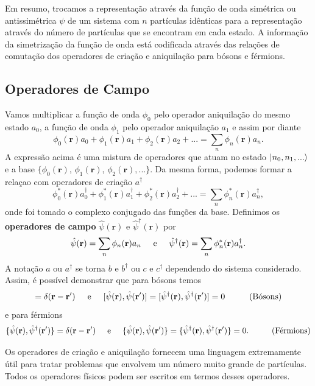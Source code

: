 \documentclass{article}
\begin{document}
Em resumo, trocamos a representação através da função de onda simétrica ou antissimétrica $\psi$ de um sistema com $n$ partículas idênticas para a representação através do número de partículas que se encontram em cada estado. A informação da simetrização da função de onda está codificada através das relações de comutação dos operadores de criação e aniquilação para bósons e férmions.


\subsection{Operadores de Campo}

Vamos multiplicar a função de onda $\phi_0$ pelo operador aniquilação do mesmo estado $a_0$, a função de onda $\phi_1$ pelo operador aniquilação $a_1$ e assim por diante
\begin{equation}
    \phi_0(\mathbf{r})a_0 + \phi_1(\mathbf{r})a_1 + \phi_2(\mathbf{r})a_2 + ... = \sum_n \phi_n(\mathbf{r})a_n.
\end{equation}
A expressão acima é uma mistura de operadores que atuam no estado $\ket{n_0,n_1,...}$ e a base $\{ \phi_0(\mathbf{r})$, $\phi_1(\mathbf{r})$, $\phi_2(\mathbf{r}),...\}$. Da mesma forma, podemos formar a relaçao com operadores de criação $a^\dagger$
\begin{equation}
    \phi_0^* (\mathbf{r})a_0^\dagger + \phi_1^* (\mathbf{r})a_1^\dagger + \phi_2^* (\mathbf{r})a_2^\dagger + ... = \sum_n \phi_n^* (\mathbf{r})a_n^\dagger,
\end{equation}
onde foi tomado o complexo conjugado das funções da base. Definimos os \textbf{operadores de campo} $\hat{\psi}(\mathbf{r})$ e $\hat{\psi}^\dagger (\mathbf{r})$ por
\begin{equation}
    \hat{\psi}(\mathbf{r}) = \sum_n \phi_n(\mathbf{r})a_n \hspace{0.5cm} \text{e} \hspace{0.5cm} \hat{\psi}^\dagger (\mathbf{r}) = \sum_n \phi_n^* (\mathbf{r})a_n^\dagger.
\end{equation}
A notação $a$ ou $a^\dagger$ se torna $b$ e $b^\dagger$ ou $c$ e $c^\dagger$ dependendo do sistema considerado. Assim, é possível demonstrar que para bósons temos
\begin{equation}
    [\hat{\psi}(\mathbf{r}),\hat{\psi}^\dagger (\mathbf{r}')] = \delta(\mathbf{r}-\mathbf{r}') \hspace{0.5cm} \text{e} \hspace{0.5cm} [\hat{\psi}(\mathbf{r}),\hat{\psi} (\mathbf{r}')] = [\hat{\psi}^\dagger (\mathbf{r}),\hat{\psi}^\dagger (\mathbf{r}')]=0 \hspace{1cm} \text{(Bósons)}
\end{equation}
e para férmions
\begin{equation}
    \{\hat{\psi}(\mathbf{r}),\hat{\psi}^\dagger (\mathbf{r}')\} = \delta(\mathbf{r}-\mathbf{r}') \hspace{0.5cm} \text{e} \hspace{0.5cm} \{\hat{\psi}(\mathbf{r}),\hat{\psi} (\mathbf{r}')\} = \{\hat{\psi}^\dagger (\mathbf{r}),\hat{\psi}^\dagger (\mathbf{r}')\}=0. \hspace{1cm} \text{(Férmions)}
\end{equation}

Os operadores de criação e aniquilação fornecem uma linguagem extremamente útil para tratar problemas que envolvem um número muito grande de partículas. Todos os operadores físicos podem ser escritos em termos desses operadores.
\end{document}
